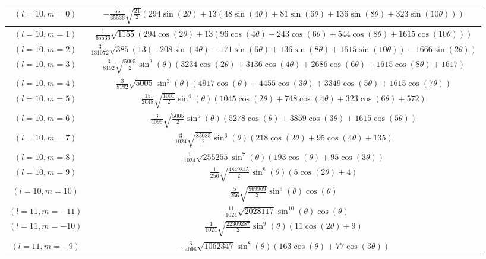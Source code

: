 \begin{center}
\begin{longtable}{|c|c|}
$(l=10, m=0)$ & $-\frac{55}{65536} \sqrt{\frac{21}{2}} (294 \sin (2 \theta )+13 (48 \sin (4 \theta )+81 \sin (6 \theta )+136 \sin (8 \theta )+323 \sin (10 \theta )))$ \\ \hline
\rowcolor{gray!15}
$(l=10, m=1)$ & $\frac{1}{65536} \sqrt{1155} (294 \cos (2 \theta )+13 (96 \cos (4 \theta )+243 \cos (6 \theta )+544 \cos (8 \theta )+1615 \cos (10 \theta )))$ \\ \hline
$(l=10, m=2)$ & $\frac{3}{131072} \sqrt{385} (13 (-208 \sin (4 \theta )-171 \sin (6 \theta )+136 \sin (8 \theta )+1615 \sin (10 \theta ))-1666 \sin (2 \theta ))$ \\ \hline
\rowcolor{gray!15}
$(l=10, m=3)$ & $\frac{3}{8192} \sqrt{\frac{5005}{2}} \sin ^2(\theta ) (3234 \cos (2 \theta )+3136 \cos (4 \theta )+2686 \cos (6 \theta )+1615 \cos (8 \theta )+1617)$ \\ \hline
$(l=10, m=4)$ & $\frac{3}{8192} \sqrt{5005} \sin ^3(\theta ) (4917 \cos (\theta )+4455 \cos (3 \theta )+3349 \cos (5 \theta )+1615 \cos (7 \theta ))$ \\ \hline
\rowcolor{gray!15}
$(l=10, m=5)$ & $\frac{15}{2048} \sqrt{\frac{1001}{2}} \sin ^4(\theta ) (1045 \cos (2 \theta )+748 \cos (4 \theta )+323 \cos (6 \theta )+572)$ \\ \hline
$(l=10, m=6)$ & $\frac{3}{4096} \sqrt{\frac{5005}{2}} \sin ^5(\theta ) (5278 \cos (\theta )+3859 \cos (3 \theta )+1615 \cos (5 \theta ))$ \\ \hline
\rowcolor{gray!15}
$(l=10, m=7)$ & $\frac{3}{1024} \sqrt{\frac{85085}{2}} \sin ^6(\theta ) (218 \cos (2 \theta )+95 \cos (4 \theta )+135)$ \\ \hline
$(l=10, m=8)$ & $\frac{1}{1024} \sqrt{255255} \sin ^7(\theta ) (193 \cos (\theta )+95 \cos (3 \theta ))$ \\ \hline
\rowcolor{gray!15}
$(l=10, m=9)$ & $\frac{1}{256} \sqrt{\frac{4849845}{2}} \sin ^8(\theta ) (5 \cos (2 \theta )+4)$ \\ \hline
$(l=10, m=10)$ & $\frac{5}{256} \sqrt{\frac{969969}{2}} \sin ^9(\theta ) \cos (\theta )$ \\ \hline
\rowcolor{gray!15}
$(l=11, m=-11)$ & $-\frac{11}{1024} \sqrt{2028117} \sin ^{10}(\theta ) \cos (\theta )$ \\ \hline
$(l=11, m=-10)$ & $\frac{1}{1024} \sqrt{\frac{22309287}{2}} \sin ^9(\theta ) (11 \cos (2 \theta )+9)$ \\ \hline
\rowcolor{gray!15}
$(l=11, m=-9)$ & $-\frac{3}{4096} \sqrt{1062347} \sin ^8(\theta ) (163 \cos (\theta )+77 \cos (3 \theta ))$ \\ \hline

\end{longtable}
\end{center}
